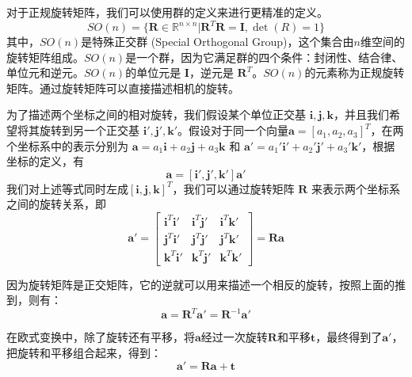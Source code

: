 对于正规旋转矩阵，我们可以使用群的定义来进行更精准的定义。
\begin{equation}
    SO(n) = \{\boldsymbol{R} \in \mathbb{R}^{n \times n} | \boldsymbol{R}^T\boldsymbol{R} = \boldsymbol{I}, \det (R) = 1\}
\end{equation}
其中，$SO(n)$是特殊正交群 (Special Orthogonal Group)，这个集合由$n$维空间的旋转矩阵组成。$SO(n)$是一个群，因为它满足群的四个条件：封闭性、结合律、单位元和逆元。$SO(n)$的单位元是 $\boldsymbol{I}$，逆元是 $\boldsymbol{R}^T$。$SO(n)$的元素称为正规旋转矩阵。通过旋转矩阵可以直接描述相机的旋转。

为了描述两个坐标之间的相对旋转，我们假设某个单位正交基 $\boldsymbol{i}, \boldsymbol{j}, \boldsymbol{k}$，并且我们希望将其旋转到另一个正交基 $\boldsymbol{i}', \boldsymbol{j}', \boldsymbol{k}'$。假设对于同一个向量$\boldsymbol{a} = [a_1, a_2, a_3]^T$，在两个坐标系中的表示分别为 $\boldsymbol{a} = a_1\boldsymbol{i} + a_2\boldsymbol{j} + a_3\boldsymbol{k}$ 和 $\boldsymbol{a}' = a_1'\boldsymbol{i}' + a_2'\boldsymbol{j}' + a_3'\boldsymbol{k}'$，根据坐标的定义，有
\begin{equation}
    [\boldsymbol{i}, \boldsymbol{j}, \boldsymbol{k}] \boldsymbol{a} = [\boldsymbol{i}', \boldsymbol{j}', \boldsymbol{k}'] \boldsymbol{a}'
\end{equation}
我们对上述等式同时左成$[\boldsymbol{i}, \boldsymbol{j}, \boldsymbol{k}]^T$，我们可以通过旋转矩阵 $\boldsymbol{R}$ 来表示两个坐标系之间的旋转关系，即
\begin{equation}
    \boldsymbol{a}' = 
    \begin{bmatrix}
    \boldsymbol{i}^T \boldsymbol{i}' & \boldsymbol{i}^T \boldsymbol{j}' & \boldsymbol{i}^T \boldsymbol{k}' \\
    \boldsymbol{j}^T \boldsymbol{i}' & \boldsymbol{j}^T \boldsymbol{j}' & \boldsymbol{j}^T \boldsymbol{k}' \\
    \boldsymbol{k}^T \boldsymbol{i}' & \boldsymbol{k}^T \boldsymbol{j}' & \boldsymbol{k}^T \boldsymbol{k}'
    \end{bmatrix}
    =
    \boldsymbol{R} \boldsymbol{a}
\end{equation}

因为旋转矩阵是正交矩阵，它的逆就可以用来描述一个相反的旋转，按照上面的推到，则有：
\begin{equation}
    \boldsymbol{a} = \boldsymbol{R}^T \boldsymbol{a}' = \boldsymbol{R}^{-1} \boldsymbol{a}'
\end{equation}

在欧式变换中，除了旋转还有平移，将$\boldsymbol{a}$经过一次旋转$\boldsymbol{R}$和平移$\boldsymbol{t}$，最终得到了$\boldsymbol{a}'$，把旋转和平移组合起来，得到：
\begin{equation}
    \boldsymbol{a}' = \boldsymbol{R} \boldsymbol{a} + \boldsymbol{t}
    \label{eq:rotation_translation}
\end{equation}

